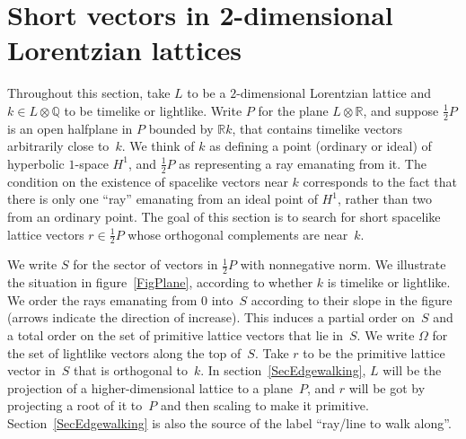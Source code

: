 \documentclass[12pt]{amsart}
\def\R{\mathbb{R}}
\def\Q{\mathbb{Q}}
\def\tensor{\otimes}
\numberwithin{theorem}{section}
\numberwithin{equation}{section}
\numberwithin{figure}{section}
\theoremstyle{remark}
\begin{document}
\section{Short vectors in 2-dimensional Lorentzian lattices}
\label{SecShortVectors}

\noindent
Throughout this section, take $L$ to be a $2$-dimensional Lorentzian
lattice and $k\in L\tensor\Q$ to be timelike or lightlike.  Write
$P$ for 
the plane  $L\tensor\R$, and suppose $\frac12P$ is
an open halfplane in $P$ bounded by $\R k$, that contains
timelike vectors arbitrarily close to~$k$.  
We think of $k$ as
defining a point (ordinary or ideal) of hyperbolic $1$-space $H^1$,
and $\frac12P$ as representing a ray emanating from it.  The condition
on the existence of spacelike vectors near $k$ corresponds to the
fact that there is only one ``ray'' emanating from an ideal point of
$H^1$, rather than two from an ordinary point.  The  
goal of this section is to search for short
spacelike lattice vectors $r\in\frac12P$
whose orthogonal complements are near~$k$.  

We write $S$ for the sector of vectors in $\frac12P$ with nonnegative norm.
We illustrate the situation in figure~\ref{FigPlane}, according to
whether $k$ is timelike or lightlike.
We order the rays emanating from $0$ into~$S$ 
according
to their slope in the figure (arrows indicate the direction
of increase).  This induces a partial order on~$S$
and a total order on the 
set of primitive lattice vectors that lie in~$S$.  
We write $\Omega$ for the set of lightlike vectors along the top of~$S$.
Take $r$ to
be the primitive lattice vector in~$S$ that is orthogonal to~$k$.
In section~\ref{SecEdgewalking}, $L$ will be the projection of a higher-dimensional
lattice to a plane~$P$, and $r$ will be got by projecting
a root of it to~$P$ and then scaling to make it primitive.
Section~\ref{SecEdgewalking}
is also the source of the label ``ray/line to walk along''.
\end{document}
